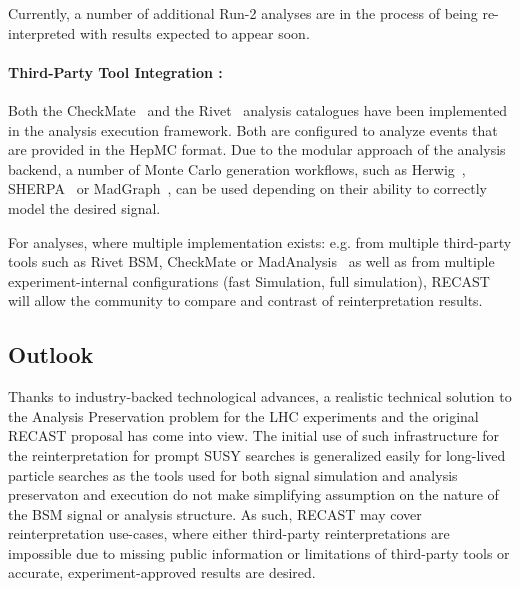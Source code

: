 
Currently, a number of additional Run-2 analyses are in the process of being re-interpreted with results expected to appear soon.

\paragraph{Third-Party Tool Integration :}

Both the CheckMate~\cite{Drees:2013wra,Dercks:2016npn} and the Rivet~\cite{Buckley:2010ar} analysis catalogues have been implemented in the analysis execution framework. Both are configured to analyze events that are provided in the HepMC format. Due to the modular approach of the analysis backend, a number of Monte Carlo generation workflows, such as Herwig~\cite{Marchesini:1991ch}, SHERPA~\cite{Gleisberg:2008ta} or MadGraph~\cite{Alwall:2011uj}, can be used depending on their ability to correctly model the desired signal.

For analyses, where multiple implementation exists: e.g. from multiple third-party tools such as Rivet BSM, CheckMate or MadAnalysis~\cite{Conte:2014zja,Dumont:2014tja} as well as from multiple experiment-internal configurations (fast Simulation, full simulation), RECAST will allow the community to compare and contrast of reinterpretation results.

\subsection{Outlook}

Thanks to industry-backed technological advances, a realistic technical solution to the Analysis Preservation problem for the LHC experiments and the original RECAST proposal has come into view. The initial use of such infrastructure for the reinterpretation for prompt SUSY searches is generalized easily for long-lived particle searches as the tools used for both signal simulation and analysis preservaton and execution do not make simplifying assumption on the nature of the BSM signal or analysis structure.  As such, RECAST may cover reinterpretation use-cases, where either third-party reinterpretations are impossible due to missing public information or limitations of third-party tools or accurate, experiment-approved results are desired.
